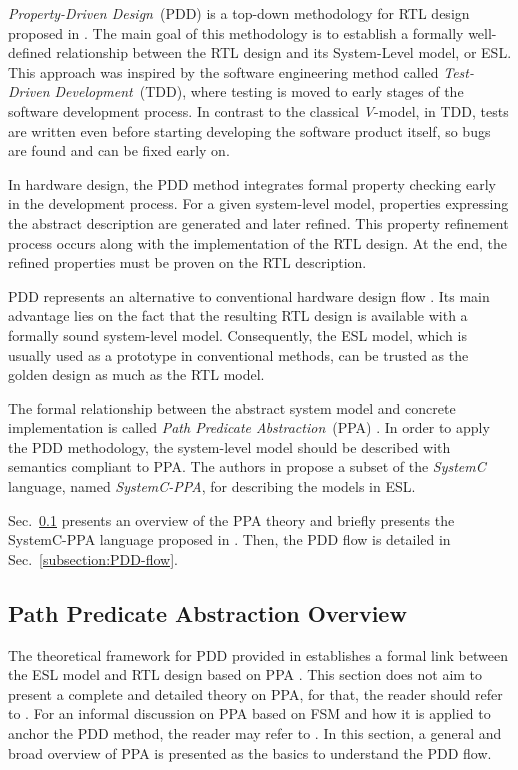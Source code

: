 \textit{Property-Driven Design}~(PDD) is a top-down methodology for RTL design proposed in \cite{paper-pdd}. The main goal of this methodology is to establish a formally well-defined relationship between the RTL design and its System-Level model, or ESL. This approach was inspired by the software engineering method called \textit{Test-Driven Development}~(TDD), where testing is moved to early stages of the software development process. In contrast to the classical \textit{V}-model, in TDD, tests are written even before starting developing the software product itself, so bugs are found and can be fixed early on. 

In hardware design, the PDD method integrates formal property checking early in the development process. For a given system-level model, properties expressing the abstract description are generated and later refined. This property refinement process occurs along with the implementation of the RTL design. At the end, the refined properties must be proven on the RTL description. 

PDD represents an alternative to conventional hardware design flow . Its main advantage lies on the fact that the resulting RTL design is available with a formally sound system-level model. Consequently, the ESL model, which is usually used as a prototype in conventional methods, can be trusted as the golden design as much as the RTL model. 

The formal relationship between the abstract system model and concrete implementation is called \textit{Path Predicate Abstraction}~(PPA) \cite{paper-ppa}. In order to apply the PDD methodology, the system-level model should be described with semantics compliant to PPA. The authors in \cite{paper-pdd} propose a subset of the \textit{SystemC} language, named \textit{SystemC-PPA}, for describing the models in ESL.

Sec.~\ref{subsection:PPA} presents an overview of the PPA theory and briefly presents the SystemC-PPA language proposed in \cite{paper-pdd}. Then, the PDD flow is detailed in Sec.~\ref{subsection:PDD-flow}.

\subsection{Path Predicate Abstraction Overview}
\label{subsection:PPA}

The theoretical framework for PDD provided in \cite{paper-pdd} establishes a formal link between the ESL model and RTL design based on PPA \cite{paper-ppa}. This section does not aim to present a complete and detailed theory on PPA, for that, the reader should refer to \cite{paper-ppa} . For an informal discussion on PPA based on FSM and how it is applied to anchor the PDD method, the reader may refer to \cite{paper-pdd}. In this section, a general and broad overview of PPA is presented as the basics to understand the PDD flow.

